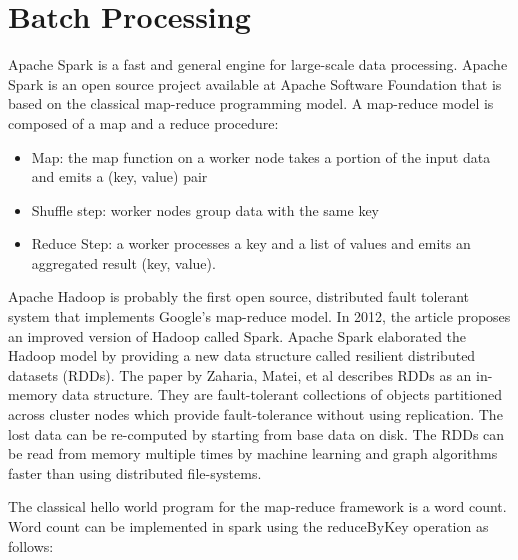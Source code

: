 \documentclass{lmproj}
\begin{document}
\section{Batch Processing}
\label{relatedwork}

Apache Spark is a fast and general engine for large-scale data processing.  Apache Spark is an open source project available at Apache Software Foundation that is based on the classical map-reduce programming model. A map-reduce model is composed of a map and a reduce procedure:

\begin{itemize}
	\item Map: the map function on a worker node takes a portion of the input data and emits a (key, value) pair
	\item Shuffle step: worker nodes group data with the same key
	\item Reduce Step: a worker processes a key and a list of values and emits an aggregated result (key, value).
\end{itemize}

Apache Hadoop is probably the first open source, distributed fault tolerant system that implements Google’s map-reduce model. In 2012, the article \cite{spark_2} proposes an improved version of Hadoop called Spark. Apache Spark elaborated the Hadoop model by providing a new data structure called resilient distributed datasets (RDDs). The paper by Zaharia, Matei, et al describes RDDs as an in-memory data structure. They are fault-tolerant collections of objects partitioned across cluster nodes which provide fault-tolerance without using replication. The lost data can be re-computed by starting from base data on disk. The RDDs can be read from memory multiple times by machine learning and graph algorithms faster than using distributed file-systems.

The classical hello world program for the map-reduce framework is a word count. Word count can be implemented in spark using the reduceByKey operation as follows:
\end{document}
